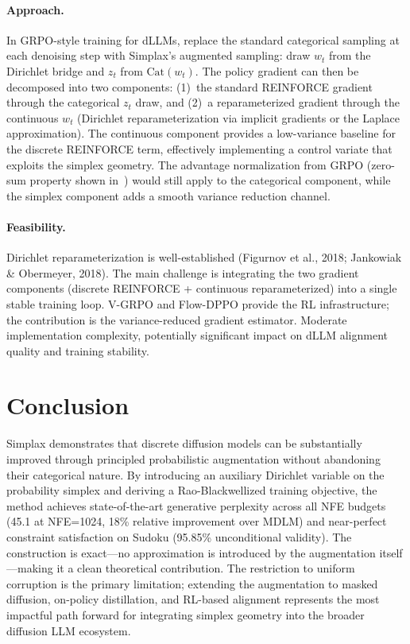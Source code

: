 \documentclass[11pt,a4paper]{article}
\begin{document}
\paragraph{Approach.} In GRPO-style training for dLLMs, replace the standard categorical sampling at each denoising step with Simplax's augmented sampling: draw $w_t$ from the Dirichlet bridge and $z_t$ from $\text{Cat}(w_t)$. The policy gradient can then be decomposed into two components: (1)~the standard REINFORCE gradient through the categorical $z_t$ draw, and (2)~a reparameterized gradient through the continuous $w_t$ (Dirichlet reparameterization via implicit gradients or the Laplace approximation). The continuous component provides a low-variance baseline for the discrete REINFORCE term, effectively implementing a control variate that exploits the simplex geometry. The advantage normalization from GRPO (zero-sum property shown in~\cite{zhu2026sft}) would still apply to the categorical component, while the simplex component adds a smooth variance reduction channel.

\paragraph{Feasibility.} Dirichlet reparameterization is well-established (Figurnov et al., 2018; Jankowiak \& Obermeyer, 2018). The main challenge is integrating the two gradient components (discrete REINFORCE + continuous reparameterized) into a single stable training loop. V-GRPO and Flow-DPPO provide the RL infrastructure; the contribution is the variance-reduced gradient estimator. Moderate implementation complexity, potentially significant impact on dLLM alignment quality and training stability.

\section{Conclusion}

Simplax demonstrates that discrete diffusion models can be substantially improved through principled probabilistic augmentation without abandoning their categorical nature. By introducing an auxiliary Dirichlet variable on the probability simplex and deriving a Rao-Blackwellized training objective, the method achieves state-of-the-art generative perplexity across all NFE budgets (45.1 at NFE=1024, 18\% relative improvement over MDLM) and near-perfect constraint satisfaction on Sudoku (95.85\% unconditional validity). The construction is exact---no approximation is introduced by the augmentation itself---making it a clean theoretical contribution. The restriction to uniform corruption is the primary limitation; extending the augmentation to masked diffusion, on-policy distillation, and RL-based alignment represents the most impactful path forward for integrating simplex geometry into the broader diffusion LLM ecosystem.
\end{document}
